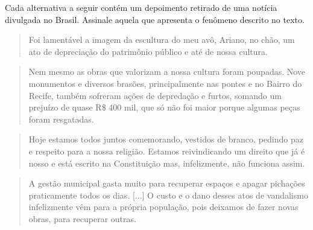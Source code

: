 Cada alternativa a seguir contém um depoimento retirado de uma notícia divulgada
no Brasil. Assinale aquela que apresenta o fenômeno descrito no texto.

\begin{escolha}
\item
\begin{quote}
Foi lamentável a imagem da escultura do meu avô, Ariano, no chão, um 
ato de depreciação do patrimônio público e até de nossa cultura.

\end{quote}

\item
\begin{quote}
Nem mesmo as obras que valorizam a nossa cultura foram poupadas. Nove 
monumentos e diversos brasões, principalmente nas pontes e no Bairro 
do Recife, também sofreram ações de depredação e furtos, somando um 
prejuízo de quase R\$ 400 mil, que só não foi maior porque algumas 
peças foram resgatadas.

\end{quote}

\item
\begin{quote}
Hoje estamos todos juntos comemorando, vestidos de branco, pedindo 
paz e respeito para a nossa religião. Estamos reivindicando um direito 
que já é nosso e está escrito na Constituição mas, infelizmente, não 
funciona assim.

\end{quote}

\item
\begin{quote}
A gestão municipal gasta muito para recuperar espaços e apagar 
pichações praticamente todos os dias. {[}...{]} O custo e o 
dano desses atos de vandalismo infelizmente vêm para a própria 
população, pois deixamos de fazer novas obras, para recuperar 
outras.

\end{quote}

\end{escolha}

